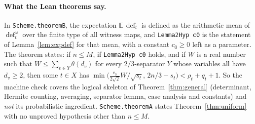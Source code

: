 \documentclass[11pt,a4paper]{article}
\theoremstyle{definition}
\theoremstyle{remark}
\newcommand{\E}{\mathbb{E}}
\newcommand{\dfc}{\operatorname{def}}
\begin{document}
\paragraph{What the Lean theorems say.} In \texttt{Scheme.theoremB}, the expectation
$\E\,\dfc_t$ is defined as the arithmetic mean of $\dfc^\omega_t$ over the finite type of all
witness maps, and \texttt{Lemma2Hyp c0} is the statement of Lemma~\ref{lem:expdef} for that
mean, with a constant $c_0\ge0$ left as a parameter. The theorem states: if $n\le M$, if
\texttt{Lemma2Hyp c0} holds, and if $W$ is a real number such that
$W\le\sum_{v\in Y}\theta(d_v)$ for every $2/3$-separator $Y$ whose variables all have
$d_v\ge2$, then some $t\in X$ has
$\min\bigl(\frac{c_0}{2\sqrt2}W/\sqrt{s_t},\,2n/3-s_t\bigr)<\rho_t+q_t+1$. So the machine
check covers the logical skeleton of Theorem~\ref{thm:general} (determinant, Hermite
counting, averaging, separator lemma, case analysis and constants) and \emph{not} its
probabilistic ingredient. \texttt{Scheme.theoremA} states Theorem~\ref{thm:uniform} with no
unproved hypothesis other than $n\le M$.
\end{document}
